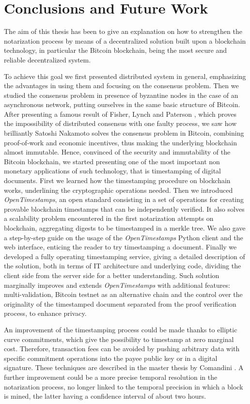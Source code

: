 \chapter{Conclusions and Future Work}
\label{chpr:conclusions}
The aim of this thesis has been to give an explanation on how to strengthen the notarization process by means of a decentralized solution built upon a blockchain technology, in particular the Bitcoin blockchain, being the most secure and reliable decentralized system.

\bigskip
\noindent
To achieve this goal we first presented distributed system in general, emphasizing the advantages in using them and focusing on the consensus problem. Then we studied the consensus problem in presence of byzantine nodes in the case of an asynchronous network, putting ourselves in the same basic structure of Bitcoin. After presenting a famous result of Fisher, Lynch and Paterson \cite{Fischer:1985:IDC:3149.214121}, which proves the impossibility of distributed consensus with one faulty process, we saw how brilliantly Satoshi Nakamoto solves the consensus problem in Bitcoin, combining proof-of-work and economic incentives, thus making the underlying blockchain almost immutable. Hence, convinced of the security and immutability of the Bitcoin blockchain, we started presenting one of the most important non monetary applications of such technology, that is timestamping of digital documents. First we learned how the timestamping procedure on blockchain works, underlining the cryptographic operations needed. Then we introduced \textit{OpenTimestamps}, an open standard consisting in a set of operations for creating provable blockchain timestamps that can be independently verified. It also solves a scalability problem encountered in the first notarization attempts on blockchain, aggregating digests to be timestamped in a merkle tree. We also gave a step-by-step guide on the usage of the \textit{OpenTimestamps} Python client and the web interface, enticing the reader to try timestamping a document. Finally we developed a fully operating timestamping service, giving a detailed description of the solution, both in terms of IT architecture and underlying code, dividing the client side from the server side for a better understanding. Such solution marginally improves and extends \textit{OpenTimestamps} with additional features: multi-validation, Bitcoin testnet as an alternative chain and the control over the originality of the timestamped document separated from the proof verification process, to enhance privacy.

\bigskip
\noindent
An improvement of the timestamping process could be made thanks to elliptic curve commitments, which give the possibility to timestamp at zero marginal cost. Therefore, transaction fees can be avoided by pushing arbitrary data with specific commitment operations into the payee public key or in a digital signature. These techniques are described in the master thesis by Comandini \cite{Comandini:Thesis:2018}. A further improvement could be a more precise temporal resolution in the notarization process, no longer linked to the temporal precision in which a block is mined, the latter having a confidence interval of about two hours.

